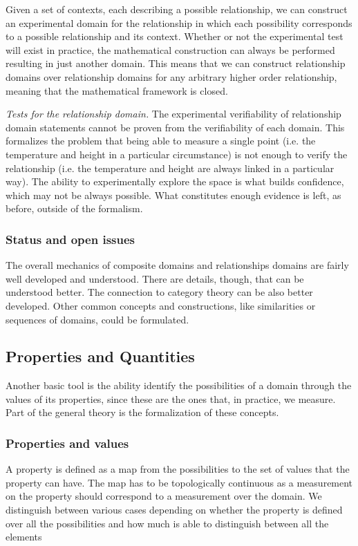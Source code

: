 \documentclass[twocolumn]{article}
\begin{document}
Given a set of contexts, each describing a possible relationship, we can construct an experimental domain for the relationship in which each possibility corresponds to a possible relationship and its context. Whether or not the experimental test will exist in practice, the mathematical construction can always be performed resulting in just another domain. This means that we can construct relationship domains over relationship domains for any arbitrary higher order relationship, meaning that the mathematical framework is closed.

\emph{Tests for the relationship domain.} The experimental verifiability of relationship domain statements cannot be proven from the verifiability of each domain. This formalizes the problem that being able to measure a single point (i.e. the temperature and height in a particular circumstance) is not enough to verify the relationship (i.e. the temperature and height are always linked in a particular way). The ability to experimentally explore the space is what builds confidence, which may not be always possible. What constitutes enough evidence is left, as before, outside of the formalism.


\subsubsection{Status and open issues}

The overall mechanics of composite domains and relationships domains are fairly well developed and understood. There are details, though, that can be understood better. The connection to category theory can be also better developed. Other common concepts and constructions, like similarities or sequences of domains, could be formulated.

\subsection{Properties and Quantities}

Another basic tool is the ability identify the possibilities of a domain through the values of its properties, since these are the ones that, in practice, we measure. Part of the general theory is the formalization of these concepts.

\subsubsection{Properties and values}

A property is defined as a map from the possibilities to the set of values that the property can have. The map has to be topologically continuous as a measurement on the property should correspond to a measurement over the domain. We distinguish between various cases depending on whether the property is defined over all the possibilities and how much is able to distinguish between all the elements
\end{document}
